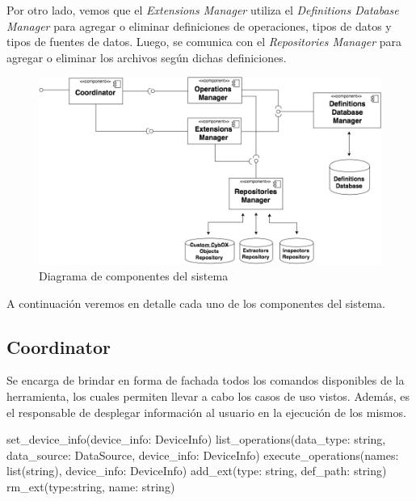 Por otro lado, vemos que el \emph{Extensions Manager} utiliza el \emph{Definitions Database Manager} para agregar o eliminar definiciones de operaciones, tipos de datos y tipos de fuentes de datos. Luego, se comunica con el \emph{Repositories Manager} para agregar o eliminar los archivos según dichas definiciones.
\newline

\begin{figure}[H]
    \begin{center}
        \includegraphics[width=\textwidth]{figures/diagrama_de_componentes}
        \caption{Diagrama de componentes del sistema}
        \label{DiagramaComponentes}
    \end{center}
\end{figure}


A continuación veremos en detalle cada uno de los componentes del sistema.

\subsection{Coordinator}
Se encarga de brindar en forma de fachada todos los comandos disponibles de la herramienta, los cuales permiten llevar a cabo los casos de uso vistos. Además, es el responsable de desplegar información al usuario en la ejecución de los mismos.
\newline

\begin{python}[title=Interfaz Coordinator, captionpos=b]
set_device_info(device_info: DeviceInfo)
list_operations(data_type: string, data_source: DataSource,
                device_info: DeviceInfo)
execute_operations(names: list(string), device_info: DeviceInfo)
add_ext(type: string, def_path: string)
rm_ext(type:string, name: string)
\end{python}

